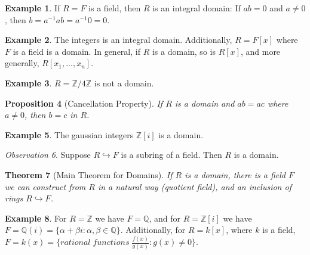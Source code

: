 \documentclass[12pt]{article}
\newtheorem{thm}{Theorem}[section]
\newtheorem{prop}[thm]{Proposition}
\theoremstyle{definition}
\newtheorem{eg}[thm]{Example}
\theoremstyle{remark}
\newtheorem{obs}[thm]{Observation}
\numberwithin{equation}{section}
\newcommand\Z{\mathbb Z}    %
\newcommand\Q{\mathbb Q}    %
\begin{document}
\vspace{15pt}

\begin{eg}
        If $R = F$ is a field, then $R$ is an integral domain: If $ab = 0$ and $a \neq 0$, then $b = a^{-1}ab = a^{-1}0 = 0$.
\end{eg}


\vspace{15pt}

\begin{eg}
        The integers is an integral domain. Additionally, $R = F[x]$ where $F$ is a field is a domain. In general, if $R$ is a domain, so is $R[x]$, and more generally, $R[x_1,...,x_n]$.
\end{eg}


\vspace{15pt}

\begin{eg}
        $R = \Z/4\Z$ is not a domain.
\end{eg}


\vspace{15pt}


\begin{prop}[Cancellation Property]
        If $R$ is a domain and $ab = ac$ where $a \neq 0$, then $b = c$ in $R$.
\end{prop}

\vspace{15pt}

\begin{eg}
        The gaussian integers $\Z[i]$ is a domain.
\end{eg}

\vspace{15pt}

\begin{obs}
        Suppose $R \hookrightarrow F$ is a subring of a field. Then $R$ is a domain.
\end{obs}


\vspace{15pt}


\begin{thm}[Main Theorem for Domains]
        If $R$ is a domain, there is a field $F$ we can construct from $R$ in a natural way (quotient field), and an inclusion of rings $R\hookrightarrow F$.
\end{thm}


\vspace{15pt}

\begin{eg}
        For $R = \Z$ we have $F = \Q$, and for $R = \Z[i]$ we have $F = \Q(i) = \{\alpha + \beta i:\alpha,\beta \in \Q\}$. Additionally, for $R = k[x]$, where $k$ is a field, $F = k(x) = \{rational\;functions\;\frac{f(x)}{g(x)}:g(x) \neq 0\}$.
\end{eg}
\end{document}
